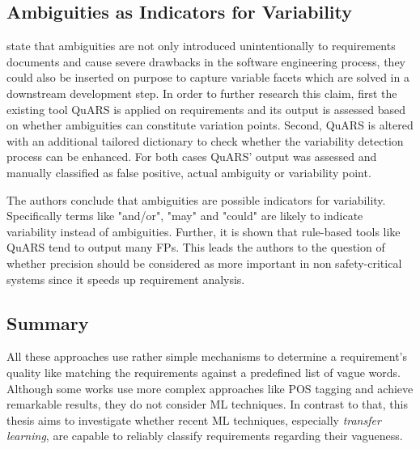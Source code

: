 \subsection{Ambiguities as Indicators for Variability}
\textcite{Fantechi:2018} state that ambiguities are not only introduced unintentionally to requirements documents and cause severe drawbacks in the software engineering process, they could also be inserted on purpose to capture variable facets which are solved in a downstream development step.
In order to further research this claim, first the existing tool \ac{QuARS} \parencite{Fabbrini:2002} is applied on requirements and its output is assessed based on whether ambiguities can constitute variation points.
Second, \ac{QuARS} is altered with an additional tailored dictionary to check whether the variability detection process can be enhanced.
For both cases \ac{QuARS}' output was assessed and manually classified as false positive, actual ambiguity or variability point.

The authors conclude that ambiguities are possible indicators for variability.
Specifically terms like "and/or", "may" and "could" are likely to indicate variability instead of ambiguities.
Further, it is shown that rule-based tools like \ac{QuARS} tend to output many \acp{FP}.
This leads the authors to the question of whether precision should be considered as more important in non safety-critical systems since it speeds up requirement analysis.

\subsection{Summary}
All these approaches use rather simple mechanisms to determine a requirement's quality like matching the requirements against a predefined list of vague words.
Although some works use more complex approaches like \ac{POS} tagging and achieve remarkable results, they do not consider \ac{ML} techniques.
In contrast to that, this thesis aims to investigate whether recent \ac{ML} techniques, especially \textit{transfer learning}, are capable to reliably classify requirements regarding their vagueness.
